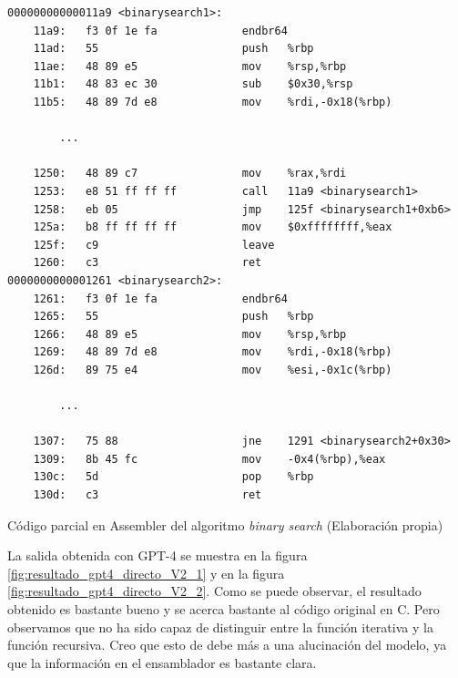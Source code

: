 \begin{mycode}
    \begin{verbatim}
00000000000011a9 <binarysearch1>:
    11a9:	f3 0f 1e fa          	endbr64
    11ad:	55                   	push   %rbp
    11ae:	48 89 e5             	mov    %rsp,%rbp
    11b1:	48 83 ec 30          	sub    $0x30,%rsp
    11b5:	48 89 7d e8          	mov    %rdi,-0x18(%rbp)
    
        ...

    1250:	48 89 c7             	mov    %rax,%rdi
    1253:	e8 51 ff ff ff       	call   11a9 <binarysearch1>
    1258:	eb 05                	jmp    125f <binarysearch1+0xb6>
    125a:	b8 ff ff ff ff       	mov    $0xffffffff,%eax
    125f:	c9                   	leave
    1260:	c3                   	ret
0000000000001261 <binarysearch2>:
    1261:	f3 0f 1e fa          	endbr64
    1265:	55                   	push   %rbp
    1266:	48 89 e5             	mov    %rsp,%rbp
    1269:	48 89 7d e8          	mov    %rdi,-0x18(%rbp)
    126d:	89 75 e4             	mov    %esi,-0x1c(%rbp)
    
        ...

    1307:	75 88                	jne    1291 <binarysearch2+0x30>
    1309:	8b 45 fc             	mov    -0x4(%rbp),%eax
    130c:	5d                   	pop    %rbp
    130d:	c3                   	ret
    \end{verbatim}
    \caption[Código parcial en Assembler del algoritmo \textit{binary search}]{Código parcial en Assembler del algoritmo \textit{binary search} (Elaboración propia)}
    \label{cod:binarySearchAsm_parcial}
\end{mycode}

La salida obtenida con GPT-4 se muestra en la figura \ref{fig:resultado_gpt4_directo_V2_1} y
en la figura \ref{fig:resultado_gpt4_directo_V2_2}. Como se puede observar, el resultado obtenido
es bastante bueno y se acerca bastante al código original en C. Pero observamos que no ha sido capaz
de distinguir entre la función iterativa y la función recursiva. Creo que esto de debe más a una
alucinación del modelo, ya que la información en el ensamblador es bastante clara.

